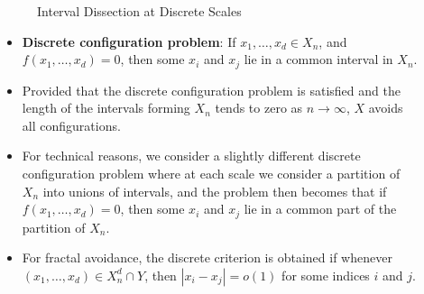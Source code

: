\documentclass[final]{beamer}
\newlength{\sepwid}
\newlength{\onecolwid}
\newlength{\twocolwid}
\begin{document}
\begin{frame}[t]
\begin{columns}[t]
\begin{column}{\onecolwid}
\begin{figure}
\begin{tikzpicture}[scale=4]
\end{tikzpicture}
\caption{Interval Dissection at Discrete Scales}
\end{figure}

\vspace{-2cm}

\begin{block}{}
\begin{itemize}
	\item {\bf Discrete configuration problem}: If $x_1, \dots, x_d \in X_n$, and $f(x_1, \dots, x_d) = 0$, then some $x_i$ and $x_j$ lie in a common interval in $X_n$.

	\item Provided that the discrete configuration problem is satisfied and the length of the intervals forming $X_n$ tends to zero as $n \to \infty$, $X$ avoids all configurations.

	\item For technical reasons, we consider a slightly different discrete configuration problem where at each scale we consider a partition of $X_n$ into unions of intervals, and the problem then becomes that if $f(x_1, \dots, x_d) = 0$, then some $x_i$ and $x_j$ lie in a common part of the partition of $X_n$.

	\item For fractal avoidance, the discrete criterion is obtained if whenever $(x_1, \dots, x_d) \in X_n^d \cap Y$, then $|x_i - x_j| = o(1)$ for some indices $i$ and $j$.
\end{itemize}


\end{block}

\end{column} %

\begin{column}{\sepwid}\end{column} %

\begin{column}{\twocolwid} %

\begin{columns}[t,totalwidth=\twocolwid] %

\begin{column}{\onecolwid}\vspace{-.6in} %


\end{column}
\end{columns}
\end{column}
\end{columns}
\end{frame}
\end{document}
